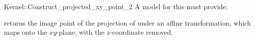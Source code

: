 \begin{ccRefFunctionObjectConcept}{Kernel::Construct_projected_xy_point_2}
A model for this must provide:


       {returns the image point of the projection of  under an affine
        transformation, which maps  onto the $xy$-plane, with the
        $z$-coordinate removed.}

\end{ccRefFunctionObjectConcept}
